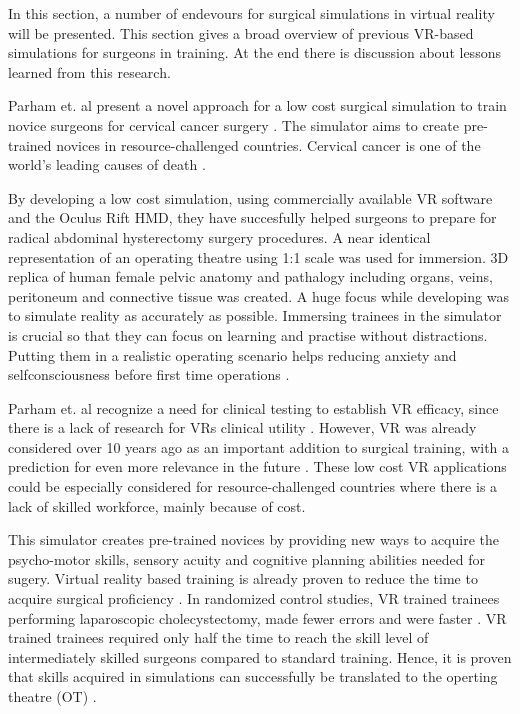 In this section, a number of endevours for surgical simulations in virtual reality will be presented.
This section gives a broad overview of previous VR-based simulations for surgeons in training.
At the end there is discussion about lessons learned from this research.

Parham et. al present a novel approach for a low cost surgical simulation to train novice surgeons for cervical cancer surgery \cite{RN52}.
The simulator aims to create pre-trained novices in resource-challenged countries. 
Cervical cancer is one of the world's leading causes of death \cite{RN52}.

By developing a low cost simulation, using commercially available VR software and the Oculus Rift HMD, they have succesfully 
helped surgeons to prepare for radical abdominal hysterectomy surgery procedures.
A near identical representation of an operating theatre using 1:1 scale was used for immersion.
3D replica of human female pelvic anatomy and pathalogy including organs, veins, peritoneum and connective tissue was created.
A huge focus while developing was to simulate reality as accurately as possible. 
Immersing trainees in the simulator is crucial so that they can focus on learning and practise without distractions.
Putting them in a realistic operating scenario helps reducing anxiety and selfconsciousness before first time operations \cite{RN52}.

Parham et. al recognize a need for clinical testing to establish VR efficacy, since there is a lack of research for VRs clinical utility \cite{RN59}. 
However, VR was already considered over 10 years ago as an important addition to surgical training, with a prediction for even more relevance in the future \cite{RN60}.
These low cost VR applications could be especially considered for resource-challenged countries where there is a lack of skilled workforce, mainly because of cost.

This simulator creates pre-trained novices by providing new ways to acquire the psycho-motor skills, sensory acuity and cognitive planning abilities needed for sugery.
Virtual reality based training is already proven to reduce the time to acquire surgical proficiency \cite{RN61,RN62}. 
In randomized control studies, VR trained trainees performing laparoscopic cholecystectomy, made fewer errors and were faster \cite{RN63,RN64}.
VR trained trainees required only half the time to reach the skill level of intermediately skilled surgeons compared to standard training.
Hence, it is proven that skills acquired in simulations can successfully be translated to the operting theatre (OT) \cite{RN63,RN64}.

